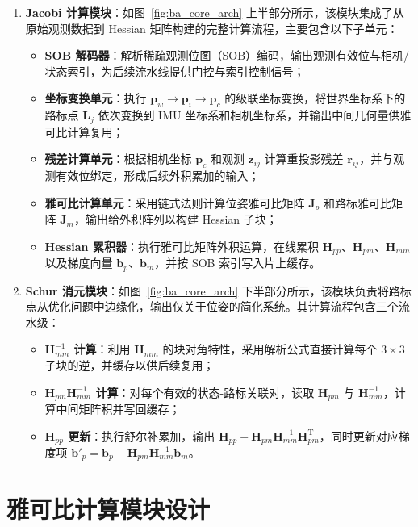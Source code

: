 \begin{enumerate}
    \item \textbf{Jacobi 计算模块}：如图~\ref{fig:ba_core_arch} 上半部分所示，该模块集成了从原始观测数据到 Hessian 矩阵构建的完整计算流程，主要包含以下子单元：
    \begin{itemize}
        \item \textbf{SOB 解码器}：解析稀疏观测位图（SOB）编码，输出观测有效位与相机/状态索引，为后续流水线提供门控与索引控制信号；
        \item \textbf{坐标变换单元}：执行 $\mathbf{p}_w \to \mathbf{p}_i \to \mathbf{p}_c$ 的级联坐标变换，将世界坐标系下的路标点 $\mathbf{L}_j$ 依次变换到 IMU 坐标系和相机坐标系，并输出中间几何量供雅可比计算复用；
        \item \textbf{残差计算单元}：根据相机坐标 $\mathbf{p}_c$ 和观测 $\mathbf{z}_{ij}$ 计算重投影残差 $\mathbf{r}_{ij}$，并与观测有效位绑定，形成后续外积累加的输入；
        \item \textbf{雅可比计算单元}：采用链式法则计算位姿雅可比矩阵 $\mathbf{J}_p$ 和路标雅可比矩阵 $\mathbf{J}_m$，输出给外积阵列以构建 Hessian 子块；
        \item \textbf{Hessian 累积器}：执行雅可比矩阵外积运算，在线累积 $\mathbf{H}_{pp}$、$\mathbf{H}_{pm}$、$\mathbf{H}_{mm}$ 以及梯度向量 $\mathbf{b}_p$、$\mathbf{b}_m$，并按 SOB 索引写入片上缓存。
    \end{itemize}
    \item \textbf{Schur 消元模块}：如图~\ref{fig:ba_core_arch} 下半部分所示，该模块负责将路标点从优化问题中边缘化，输出仅关于位姿的简化系统。其计算流程包含三个流水级：
    \begin{itemize}
        \item \textbf{$\mathbf{H}_{mm}^{-1}$ 计算}：利用 $\mathbf{H}_{mm}$ 的块对角特性，采用解析公式直接计算每个 $3\times3$ 子块的逆，并缓存以供后续复用；
        \item \textbf{$\mathbf{H}_{pm}\mathbf{H}_{mm}^{-1}$ 计算}：对每个有效的状态-路标关联对，读取 $\mathbf{H}_{pm}$ 与 $\mathbf{H}_{mm}^{-1}$，计算中间矩阵积并写回缓存；
        \item \textbf{$\mathbf{H}_{pp}$ 更新}：执行舒尔补累加，输出 $\mathbf{H}_{pp} - \mathbf{H}_{pm}\mathbf{H}_{mm}^{-1}\mathbf{H}_{pm}^{\mathrm{T}}$，同时更新对应梯度项 $\mathbf{b}'_p = \mathbf{b}_p - \mathbf{H}_{pm}\mathbf{H}_{mm}^{-1}\mathbf{b}_m$。
    \end{itemize}
\end{enumerate}

\section{雅可比计算模块设计}

